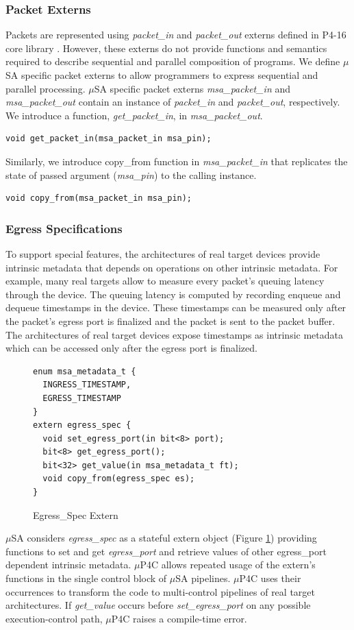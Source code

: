 \subsubsection{Packet Externs}
Packets are represented using \emph{packet\-\_in} and \emph{packet\_out} externs defined in P4-16 core library \cite{core.p4}.
However, these externs do not provide functions and semantics required to describe sequential and parallel composition of programs.
We define $\mu$SA specific packet externs to allow programmers to express sequential and parallel processing. 
$\mu$SA specific packet externs \emph{msa\_packet\_in} and \emph{msa\_packet\_out} contain an instance of \emph{packet\_in} and \emph{packet\_out}, respectively.
We introduce a function, \emph{get\-\_packet\-\_in}, in \emph{msa\-\_packet\-\_out}.
\begin{lstlisting}[frame=none]
void get_packet_in(msa_packet_in msa_pin);
\end{lstlisting}
Similarly, we introduce copy\_from function in \emph{msa\_packet\_in} that replicates the state of passed argument (\emph{msa\_pin}) to the calling instance.
\begin{lstlisting}[frame=none]
void copy_from(msa_packet_in msa_pin);
\end{lstlisting}
\subsubsection{Egress Specifications}
To support special features, the architectures of real target devices provide intrinsic metadata  that depends on operations on other intrinsic metadata.
For example,  many real targets allow to measure every packet's queuing latency through the device.
The queuing latency is computed by recording enqueue and dequeue timestamps in the device.
These timestamps can be measured only after the packet's egress port is finalized and the packet is sent to the packet buffer.
The architectures of real target devices expose timestamps as intrinsic metadata which can be accessed only after the egress port is finalized.
\begin{figure}[!h]
\begin{lstlisting}[frame=none]
enum msa_metadata_t {
  INGRESS_TIMESTAMP,
  EGRESS_TIMESTAMP
}
extern egress_spec {
  void set_egress_port(in bit<8> port);
  bit<8> get_egress_port();
  bit<32> get_value(in msa_metadata_t ft);
  void copy_from(egress_spec es);
}
\end{lstlisting}
\caption{Egress\_Spec Extern}
\label{fig:msa-egress-spec-extern}
\end{figure}
$\mu$SA considers \emph{egress\_spec} as a stateful extern object (Figure \ref{fig:msa-egress-spec-extern}) providing functions to set and get \emph{egress\_port} and retrieve values of other egress\_port dependent intrinsic metadata.
$\mu$P4C allows repeated usage of the extern's functions in the single control block of $\mu$SA pipelines.
$\mu$P4C uses their occurrences to transform the code to multi-control pipelines of real target architectures.
If \emph{get\_value} occurs before \emph{set\_egress\_port} on any possible execution-control path, $\mu$P4C raises a compile-time error.

